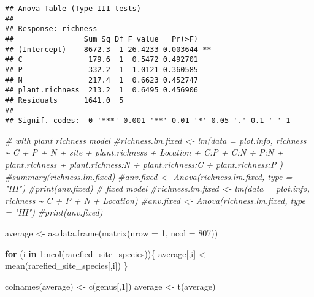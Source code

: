 \documentclass[
]{article}
\newenvironment{Shaded}{\begin{snugshade}}{\end{snugshade}}
\newcommand{\AttributeTok}[1]{\textcolor[rgb]{0.77,0.63,0.00}{#1}}
\newcommand{\CommentTok}[1]{\textcolor[rgb]{0.56,0.35,0.01}{\textit{#1}}}
\newcommand{\ControlFlowTok}[1]{\textcolor[rgb]{0.13,0.29,0.53}{\textbf{#1}}}
\newcommand{\DecValTok}[1]{\textcolor[rgb]{0.00,0.00,0.81}{#1}}
\newcommand{\FunctionTok}[1]{\textcolor[rgb]{0.00,0.00,0.00}{#1}}
\newcommand{\NormalTok}[1]{#1}
\newcommand{\OtherTok}[1]{\textcolor[rgb]{0.56,0.35,0.01}{#1}}
\newcommand{\SpecialCharTok}[1]{\textcolor[rgb]{0.00,0.00,0.00}{#1}}
\begin{document}
\begin{verbatim}
## Anova Table (Type III tests)
## 
## Response: richness
##                Sum Sq Df F value   Pr(>F)   
## (Intercept)    8672.3  1 26.4233 0.003644 **
## C               179.6  1  0.5472 0.492701   
## P               332.2  1  1.0121 0.360585   
## N               217.4  1  0.6623 0.452747   
## plant.richness  213.2  1  0.6495 0.456906   
## Residuals      1641.0  5                    
## ---
## Signif. codes:  0 '***' 0.001 '**' 0.01 '*' 0.05 '.' 0.1 ' ' 1
\end{verbatim}

\begin{Shaded}
\begin{Highlighting}[]
\CommentTok{\# with plant richness model}
\CommentTok{\#richness.lm.fixed \textless{}{-} lm(data = plot.info, richness \textasciitilde{} C + P + N + site + plant.richness + Location + C:P + C:N + P:N + plant.richness + plant.richness:N + plant.richness:C + plant.richness:P )}
\CommentTok{\#summary(richness.lm.fixed)}
\CommentTok{\#anv.fixed \textless{}{-} Anova(richness.lm.fixed, type = "III")}
\CommentTok{\#print(anv.fixed)}
\CommentTok{\# fixed model}
\CommentTok{\#richness.lm.fixed \textless{}{-} lm(data = plot.info, richness \textasciitilde{} C + P + N + Location)}
\CommentTok{\#anv.fixed \textless{}{-} Anova(richness.lm.fixed, type = "III")}
\CommentTok{\#print(anv.fixed)}
\end{Highlighting}
\end{Shaded}

\begin{Shaded}
\begin{Highlighting}[]
\NormalTok{average }\OtherTok{\textless{}{-}} \FunctionTok{as.data.frame}\NormalTok{(}\FunctionTok{matrix}\NormalTok{(}\AttributeTok{nrow =} \DecValTok{1}\NormalTok{, }\AttributeTok{ncol =} \DecValTok{807}\NormalTok{))}

\ControlFlowTok{for}\NormalTok{ (i }\ControlFlowTok{in} \DecValTok{1}\SpecialCharTok{:}\FunctionTok{ncol}\NormalTok{(rarefied\_site\_species))\{}
\NormalTok{  average[,i] }\OtherTok{\textless{}{-}} \FunctionTok{mean}\NormalTok{(rarefied\_site\_species[,i])}
\NormalTok{\}}

\FunctionTok{colnames}\NormalTok{(average) }\OtherTok{\textless{}{-}} \FunctionTok{c}\NormalTok{(genus[,}\DecValTok{1}\NormalTok{])}
\NormalTok{average }\OtherTok{\textless{}{-}} \FunctionTok{t}\NormalTok{(average)}
\end{Highlighting}
\end{Shaded}
\end{document}
